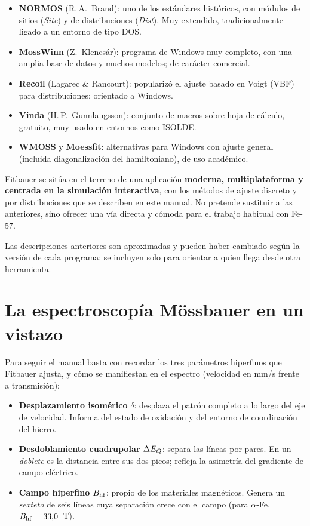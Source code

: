 \begin{itemize}[nosep]
  \item \textbf{NORMOS} (R.\,A.\ Brand): uno de los estándares históricos, con
        módulos de sitios (\emph{Site}) y de distribuciones (\emph{Dist}). Muy
        extendido, tradicionalmente ligado a un entorno de tipo DOS.
  \item \textbf{MossWinn} (Z.\ Klencsár): programa de Windows muy completo, con
        una amplia base de datos y muchos modelos; de carácter comercial.
  \item \textbf{Recoil} (Lagarec \& Rancourt): popularizó el ajuste basado en
        Voigt (VBF) para distribuciones; orientado a Windows.
  \item \textbf{Vinda} (H.\,P.\ Gunnlaugsson): conjunto de macros sobre hoja de
        cálculo, gratuito, muy usado en entornos como ISOLDE.
  \item \textbf{WMOSS} y \textbf{Moessfit}: alternativas para Windows con ajuste
        general (incluida diagonalización del hamiltoniano), de uso académico.
\end{itemize}

Fitbauer se sitúa en el terreno de una aplicación \textbf{moderna,
multiplataforma y centrada en la simulación interactiva}, con los métodos de
ajuste discreto y por distribuciones que se describen en este manual. No pretende
sustituir a las anteriores, sino ofrecer una vía directa y cómoda para el trabajo
habitual con Fe-57.

\begin{nota}
Las descripciones anteriores son aproximadas y pueden haber cambiado según la
versión de cada programa; se incluyen solo para orientar a quien llega desde otra
herramienta.
\end{nota}

\section{La espectroscopía Mössbauer en un vistazo}
\label{sec:mossbauer-vistazo}

Para seguir el manual basta con recordar los tres parámetros hiperfinos que
Fitbauer ajusta, y cómo se manifiestan en el espectro (velocidad en mm/s frente a
transmisión):

\begin{itemize}[nosep]
  \item \textbf{Desplazamiento isomérico} $\delta$: desplaza el patrón completo a
        lo largo del eje de velocidad. Informa del estado de oxidación y del
        entorno de coordinación del hierro.
  \item \textbf{Desdoblamiento cuadrupolar} $\Delta E_{Q}$: separa las líneas por pares.
        En un \emph{doblete} es la distancia entre sus dos picos; refleja la
        asimetría del gradiente de campo eléctrico.
  \item \textbf{Campo hiperfino} $B_{\mathrm{hf}}$: propio de los materiales magnéticos.
        Genera un \emph{sexteto} de seis líneas cuya separación crece con el
        campo (para $\alpha$-Fe, $B_{\mathrm{hf}} = 33{,}0$~T).
\end{itemize}

